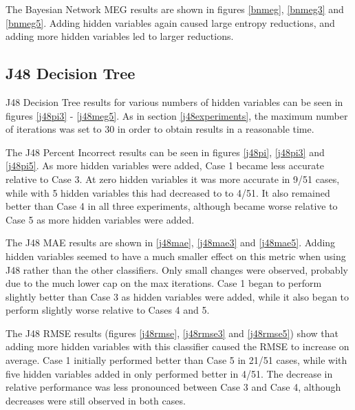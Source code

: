 The Bayesian Network MEG results are shown in figures \ref{bnmeg}, \ref{bnmeg3} and \ref{bnmeg5}. Adding hidden variables again caused large entropy reductions, and adding more hidden variables led to larger reductions.

\linespread{1.0}








\linespread{1.3}

\subsection{J48 Decision Tree}

J48 Decision Tree results for various numbers of hidden variables can be seen in figures \ref{j48pi3} - \ref{j48meg5}. As in section \ref{j48experiments}, the maximum number of iterations was set to 30 in order to obtain results in a reasonable time.

The J48 Percent Incorrect results can be seen in figures \ref{j48pi}, \ref{j48pi3} and \ref{j48pi5}. As more hidden variables were added, Case 1 became less accurate relative to Case 3. At zero hidden variables it was more accurate in 9/51 cases, while with 5 hidden variables this had decreased to to 4/51. It also remained better than Case 4 in all three experiments, although became worse relative to Case 5 as more hidden variables were added.

The J48 MAE results are shown in \ref{j48mae}, \ref{j48mae3} and \ref{j48mae5}. Adding hidden variables seemed to have a much smaller effect on this metric when using J48 rather than the other classifiers. Only small changes were observed, probably due to the much lower cap on the max iterations. Case 1 began to perform slightly better than Case 3 as hidden variables were added, while it also began to perform slightly worse relative to Cases 4 and 5.

The J48 RMSE results (figures \ref{j48rmse}, \ref{j48rmse3} and \ref{j48rmse5}) show that adding more hidden variables with this classifier caused the RMSE to increase on average. Case 1 initially performed better than Case 5 in 21/51 cases, while with five hidden variables added in only performed better in 4/51. The decrease in relative performance was less pronounced between Case 3 and Case 4, although decreases were still observed in both cases.

